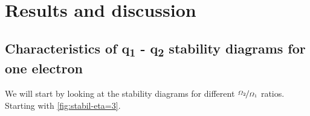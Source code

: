 \chapter{Results and discussion}
\label{chap:results}

\section{Characteristics of q\textsubscript{1} - q\textsubscript{2} stability diagrams for one electron}


We will start by looking at the stability diagrams for different $\nicefrac{\Omega_2}{\Omega_1}$ ratios. Starting with \ref{fig:stabil-eta=3}.

